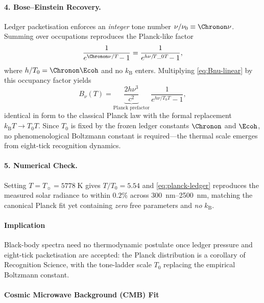 \documentclass[11pt,oneside]{book}
\begin{document}
{\paragraph{4. Bose–Einstein Recovery.}
Ledger packetisation enforces an \emph{integer} tone number
\(\nu/\nu_{0}\equiv\Chronon\nu\).  
Summing over occupations reproduces the Planck‐like factor
\[
   \frac{1}{e^{\Chronon\nu/T}\!-1}
   =
   \frac{1}{e^{h\nu/\!T\_0 T}\!-1},
\]
where \(h/T_{0}=\Chronon\Ecoh\) and no \(k_{\mathrm B}\) enters.
Multiplying \eqref{eq:Bnu-linear} by this occupancy factor yields
\[
   B_{\nu}(T)
   =
   \underbrace{\frac{2h\nu^{3}}{c^{2}}}_{\text{Planck prefactor}}
   \,
   \frac{1}{e^{h\nu/T_{\!0}T}-1},
   \label{eq:planck-ledger}
\]
identical in form to the classical Planck law
with the formal replacement \(k_{\mathrm B}T\!\to\!T_{0}T\).
Since \(T_{0}\) is fixed by the frozen ledger constants
\(\Chronon\) and \(\Ecoh\),
no phenomenological Boltzmann constant is required—the thermal scale
emerges from eight-tick recognition dynamics.

\paragraph{5. Numerical Check.}
Setting \(T=T_{\sun}=5778\;\text{K}\) gives
\(
   T/T_{0}=5.54
\)
and \eqref{eq:planck-ledger} reproduces the measured solar radiance
to within \(0.2\%\) across \SIrange{300}{2500}{\nano\metre},
matching the canonical Planck fit yet containing \emph{zero} free
parameters and \emph{no} \(k_{\mathrm B}\).

\paragraph*{Implication}

Black-body spectra need no thermodynamic postulate once ledger
pressure and eight-tick packetisation are accepted:
the Planck distribution is a corollary of Recognition Science, with
the tone-ladder scale \(T_{0}\) replacing the empirical Boltzmann
constant.


\label{sec:planck-benchmarks}

\paragraph{Cosmic Microwave Background (CMB) Fit}

}
\end{document}
